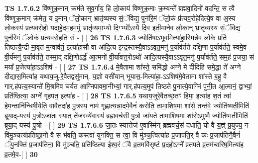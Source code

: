 \documentclass[17pt]{extarticle}
\begin{document}
                                \textbf{ TS 1.7.6.2} \newline
                  वि॑ष्णुक्र॒मान् क्रम॑ते सुव॒र्गाय॒ हि लो॒काय॑ विष्णुक्र॒माः क्र॒म्यन्ते᳚ ब्रह्मवा॒दिनो॑ वदन्ति॒ स त्वै वि॑ष्णुक्र॒मान् क्र॑मेत॒ य इ॒मान् ॅलो॒कान् भ्रातृ॑व्यस्य सं॒ॅविद्य॒ पुन॑रि॒मं ॅलो॒कं प्र॑त्यव॒रोहे॒दित्ये॒ष वा अ॒स्य लो॒कस्य॑ प्रत्यवरो॒हो यदाहे॒दम॒हम॒मुं भ्रातृ॑व्यमा॒भ्यो दि॒ग्भ्यो᳚ऽस्यै दि॒व इती॒माने॒व लो॒कान् भ्रातृ॑व्यस्य सं॒ॅविद्य॒ पुन॑रि॒मं ॅलो॒कं प्र॒त्यव॑रोहति॒ सं - [ ] \textbf{  26} \newline
                  \newline
                                \textbf{ TS 1.7.6.3} \newline
                  ज्योति॑षाऽभूव॒मित्या॑हा॒स्मिन्ने॒व लो॒के प्रति॑ तिष्ठत्यै॒न्द्री-मा॒वृत॑-म॒न्वाव॑र्त॒ इत्या॑हा॒सौ वा आ॑दि॒त्य इन्द्र॒स्तस्यै॒वाऽऽवृत॒मनु॑ प॒र्याव॑र्तते दक्षि॒णा प॒र्याव॑र्तते॒ स्वमे॒व वी॒र्य॑मनु॑ प॒र्याव॑र्तते॒ तस्मा॒द् दक्षि॒णोऽर्द्ध॑ आ॒त्मनो॑ वी॒र्या॑वत्त॒रोऽथो॑ आदि॒त्यस्यै॒वाऽऽवृत॒मनु॑ प॒र्याव॑र्तते॒ सम॒हं प्र॒जया॒ सं मया᳚ प्र॒जेत्या॑हा॒ऽऽशिष॑ - [ ] \textbf{  27} \newline
                  \newline
                                \textbf{ TS 1.7.6.4} \newline
                  मे॒वैतामा शा᳚स्ते॒ समि॑द्धो अग्ने मे दीदिहि समे॒द्धा ते॑ अग्ने दीद्यास॒मित्या॑ह यथाय॒जु-रे॒वैतद्वसु॑मान्. य॒ज्ञो वसी॑यान् भूयास॒-मित्या॑हा॒-ऽऽशिष॑मे॒वेतामा शा᳚स्ते ब॒हु वै गार्.ह॑पत्य॒स्यान्ते॑ मि॒श्रमि॑व चर्यत आग्निपावमा॒नीभ्यां॒ गार्.ह॑पत्य॒मुप॑ तिष्ठते पु॒नात्ये॒वाग्निं पु॑नी॒त आ॒त्मानं॒ द्वाभ्यां॒ प्रति॑ष्ठित्या॒ अग्ने॑ गृहपत॒ इत्या॑ह - [ ] \textbf{  28} \newline
                  \newline
                                \textbf{ TS 1.7.6.5} \newline
                  यथाय॒जुरे॒वैतच्छ॒तꣳ हिमा॒ इत्या॑ह श॒तं त्वा॑ हेम॒न्तानि॑न्धिषी॒येति॒ वावैतदा॑ह पु॒त्रस्य॒ नाम॑ गृह्णात्यन्ना॒दमे॒वैनं॑ करोति॒ तामा॒शिष॒मा शा॑से॒ तन्त॑वे॒ ज्योति॑ष्मती॒मिति॑ ब्रूया॒द्-यस्य॑ पु॒त्रोऽजा॑तः॒ स्यात् ते॑ज॒स्व्ये॑वास्य॑ ब्रह्मवर्च॒सी पु॒त्रो जा॑यते॒ तामा॒शिष॒मा शा॑से॒ऽमुष्मै॒ ज्योति॑ष्मती॒मिति॑ ब्रूया॒द्-यस्य॑ पु॒त्रो - [ ] \textbf{  29} \newline
                  \newline
                                \textbf{ TS 1.7.6.6} \newline
                  जा॒तः स्यात्तेज॑ ए॒वास्मि॑न् ब्रह्मवर्च॒सं द॑धाति॒ यो वै य॒ज्ञ्ं प्र॒युज्य॒ न वि॑मु॒ञ्चत्य॑प्रतिष्ठा॒नो वै स भ॑वति॒ कस्त्वा॑ युनक्ति॒ स त्वा॒ वि मु॑ञ्च॒त्वित्या॑ह प्र॒जाप॑ति॒र् वै कः प्र॒जाप॑तिनै॒वैनं॑ ॅयु॒नक्ति॑ प्र॒जाप॑तिना॒ वि मु॑ञ्चति॒ प्रति॑ष्ठित्या ईश्व॒रं ॅवै व्र॒तमवि॑सृष्टं प्र॒दहोऽग्ने᳚ व्रतपते व्र॒तम॑चारिष॒मित्या॑ह व्र॒तमे॒व-[ ] \textbf{  30} \newline
\end{document}
